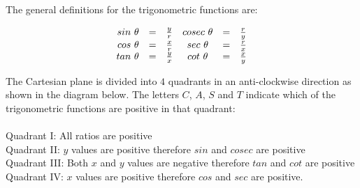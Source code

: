 The general definitions for the trigonometric functions are:

\begin{equation*}
\begin{array}{cccccc}\hfill sin~\theta & =& \frac{y}{r}\hfill & cosec~\theta & =& \frac{r}{y}\hfill \\
 \hfill cos~\theta & =& \frac{x}{r}\hfill & sec~\theta & =& \frac{r}{x}\hfill \\
 \hfill tan~\theta & =& \frac{y}{x}\hfill & cot~\theta & =& \frac{x}{y}\hfill \end{array}
\end{equation*}

The Cartesian plane is divided into $4$ quadrants in an anti-clockwise direction as shown in the diagram below. The letters $C$, $A$, $S$ and $T$ indicate which of the trigonometric functions are positive in that quadrant: \\
\\
Quadrant I: All ratios are positive\\
Quadrant II: $y$ values are positive therefore $sin$ and $cosec$ are positive\\
Quadrant III: Both $x$ and $y$ values are negative therefore $tan$ and $cot$ are positive \\
Quadrant IV: $x$ values are positive therefore $cos$ and $sec$ are positive.\par


